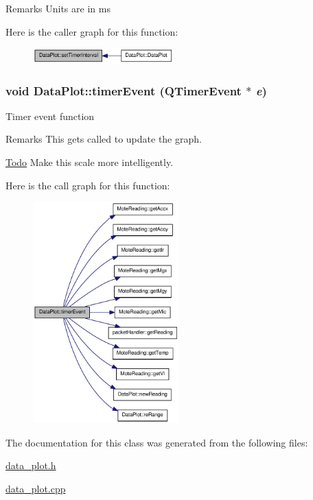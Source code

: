 \begin{DoxyRemark}{Remarks}
Units are in ms 
\end{DoxyRemark}




Here is the caller graph for this function:\nopagebreak
\begin{figure}[H]
\begin{center}
\leavevmode
\includegraphics[width=154pt]{classDataPlot_a926020e0c49d78d3d5d282848368651e_icgraph}
\end{center}
\end{figure}


\hypertarget{classDataPlot_a41c9c4bc12d8d3e3abdf893c4fcfad7b}{
\subsubsection[{timerEvent}]{\setlength{\rightskip}{0pt plus 5cm}void DataPlot::timerEvent (QTimerEvent $\ast$ {\em e})}}
\label{classDataPlot_a41c9c4bc12d8d3e3abdf893c4fcfad7b}
Timer event function

\begin{DoxyRemark}{Remarks}
This gets called to update the graph. 
\end{DoxyRemark}


\begin{Desc}
\item[\hyperlink{todo__todo000002}{Todo}]Make this scale more intelligently. \end{Desc}




Here is the call graph for this function:\nopagebreak
\begin{figure}[H]
\begin{center}
\leavevmode
\includegraphics[width=160pt]{classDataPlot_a41c9c4bc12d8d3e3abdf893c4fcfad7b_cgraph}
\end{center}
\end{figure}




The documentation for this class was generated from the following files:\begin{DoxyCompactItemize}
\item 
\hyperlink{data__plot_8h}{data\_\-plot.h}\item 
\hyperlink{data__plot_8cpp}{data\_\-plot.cpp}\end{DoxyCompactItemize}
